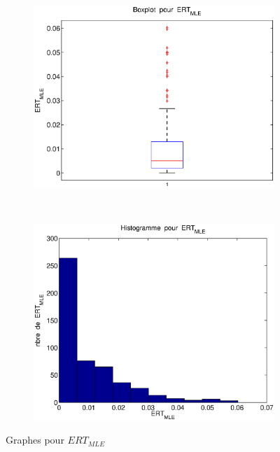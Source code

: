 \begin{figure}[!ht]
        \centering
        \begin{subfigure}[b]{0.4\textwidth}
                \includegraphics[width=\textwidth]{graphes/boxplot_ertmle.eps}
        \end{subfigure}%
        ~ 
        \begin{subfigure}[b]{0.4\textwidth}
                \includegraphics[width=\textwidth]{graphes/hist_ertmle.eps}
        \end{subfigure}
        \caption{Graphes pour $ERT_{MLE}$}\label{fig:ertmle}
\end{figure}

